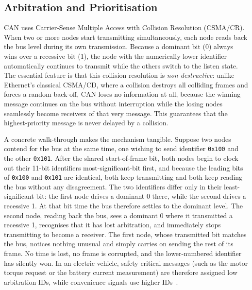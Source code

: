 \documentclass[11pt,a4paper,oneside,parskip=half]{scrreprt}
\newcommand{\canid}[1]{\texttt{0x#1}}
\providecommand{\hex}{}\renewcommand{\hex}[1]{\texttt{0x#1}}
\begin{document}
\subsection{Arbitration and Prioritisation}
CAN uses Carrier-Sense Multiple Access with Collision Resolution (CSMA/CR). When two or more nodes start transmitting simultaneously, each node reads back the bus level during its own transmission. Because a dominant bit (0) always wins over a recessive bit (1), the node with the numerically lower identifier automatically continues to transmit while the others switch to the listen state. The essential feature is that this collision resolution is \emph{non-destructive}: unlike Ethernet's classical CSMA/CD, where a collision destroys all colliding frames and forces a random back-off, CAN loses no information at all, because the winning message continues on the bus without interruption while the losing nodes seamlessly become receivers of that very message. This guarantees that the highest-priority message is never delayed by a collision.

A concrete walk-through makes the mechanism tangible. Suppose two nodes contend for the bus at the same time, one wishing to send identifier \canid{100} and the other \canid{101}. After the shared start-of-frame bit, both nodes begin to clock out their 11-bit identifiers most-significant-bit first, and because the leading bits of \hex{100} and \hex{101} are identical, both keep transmitting and both keep reading the bus without any disagreement. The two identifiers differ only in their least-significant bit: the first node drives a dominant 0 there, while the second drives a recessive 1. At that bit time the bus therefore settles to the dominant level. The second node, reading back the bus, sees a dominant 0 where it transmitted a recessive 1, recognises that it has lost arbitration, and immediately stops transmitting to become a receiver. The first node, whose transmitted bit matches the bus, notices nothing unusual and simply carries on sending the rest of its frame. No time is lost, no frame is corrupted, and the lower-numbered identifier has silently won. In an electric vehicle, safety-critical messages (such as the motor torque request or the battery current measurement) are therefore assigned low arbitration IDs, while convenience signals use higher IDs~\cite{iso11898}.
\end{document}
